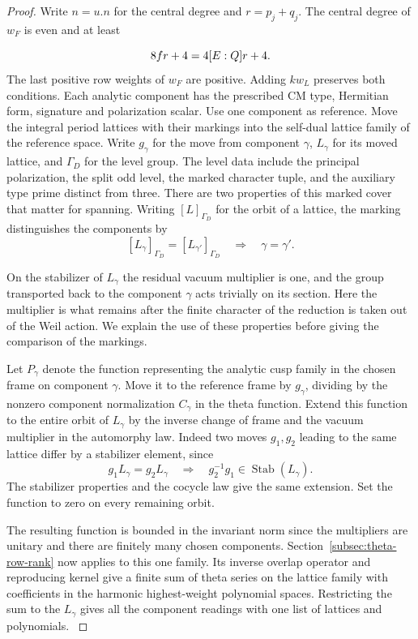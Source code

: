 \begin{proof}
Write \(n=u.n\) for the central degree and
\(r=p_j+q_j\). The central degree of \(w_F\) is even and at least

\[
  8fr+4=4[E:Q]r+4.
\]
 The last positive row weights of \(w_F\)
are positive. Adding \(k w_L\) preserves both conditions.
Each analytic component has the prescribed CM type, Hermitian form,
signature and polarization scalar. Use one component as reference.
Move the integral period lattices with their markings into the
self-dual lattice family of the reference space. Write \(g_\gamma\) for
the move from component \(\gamma\), \(L_\gamma\) for its moved lattice,
and \(\Gamma_D\) for the level group. The level data include the
principal polarization, the split odd level, the marked character
tuple, and the auxiliary type prime distinct from three. There are
two properties of this marked cover that matter for spanning.
Writing \([L]_{\Gamma_D}\) for the orbit of a lattice, the marking distinguishes the components by
\[
  [L_\gamma]_{\Gamma_D}=[L_{\gamma'}]_{\Gamma_D}\quad\Longrightarrow\quad \gamma=\gamma'.
\]

On the
stabilizer of \(L_\gamma\) the residual vacuum multiplier is one, and the
group transported back to the component \(\gamma\) acts trivially on
its section. Here the multiplier is what remains after the finite
character of the reduction is taken out of the Weil action.
We explain the use of these properties before giving the comparison
of the markings.

Let \(P_\gamma\) denote the function representing the analytic cusp family in the chosen frame on component \(\gamma\). Move it
to the reference frame by \(g_\gamma\), dividing by the nonzero component
normalization \(C_\gamma\) in the theta function. Extend this function to
the entire orbit of \(L_\gamma\) by the inverse change of frame and the
vacuum multiplier in the automorphy law. Indeed two moves \(g_1,g_2\) leading to the same lattice differ by a stabilizer element, since
\[
  g_1L_\gamma=g_2L_\gamma\quad\Longrightarrow\quad g_2^{-1}g_1\in\operatorname{Stab}(L_\gamma).
\]
 The stabilizer properties and the cocycle law give
the same extension. Set the function to zero on every remaining
orbit.

The resulting function is bounded in the invariant norm since the multipliers
are unitary and there are finitely many chosen components.
Section~\ref{subsec:theta-row-rank} now applies to this one family.
Its inverse overlap operator and reproducing kernel give a finite
sum of theta series on the lattice family with coefficients in the
harmonic highest-weight polynomial spaces. Restricting the sum to
the \(L_\gamma\) gives all the component readings with one list of
lattices and polynomials.
\label{cor:slice-shifted-theta-1}

\end{proof}

